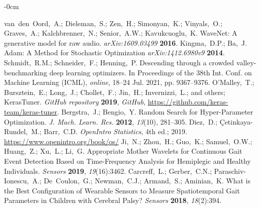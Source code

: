 \documentclass[sensors,article,submit,pdftex,moreauthors]{Definitions/mdpi}
\begin{document}
\begin{adjustwidth}{-\extralength}{0cm}
\begin{thebibliography}{999}
	van~den~Oord,~A.; Dieleman,~S.; Zen,~H.; Simonyan,~K.; Vinyals,~O.; Graves,~A.; Kalchbrenner,~N.; Senior,~A.W.; Kavukcuoglu,~K. WaveNet: A generative	model for raw audio. {\em arXiv:1609.03499} {\bf 2016}.
	Kingma,~D.P.; Ba,~J. Adam: A Method for Stochastic Optimization {\em arXiv:1412.6980v9} {\bf 2014}.
	Schmidt,~R.M.; Schneider,~F.; Henning,~P. Descending through a crowded valley-benchmarking deep learning optimizers. In Proceedings of the 38th Int. Conf. on Machine Learning (ICML), {\em online}, 18--24 Jul. 2021, pp. 9367--9376.
	O'Malley,~T.; Bursztein,~E.; Long,~J.; Chollet,~F.; Jin,~H.; Invernizzi,~L.; and others; KerasTuner. {\em GitHub repository} {\bf 2019}, {\em GitHub}, \url{https://github.com/keras-team/keras-tuner}.
	Bergstra,~J.; Bengio,~Y. Random Search for Hyper-Parameter Optimization. {\em J. Mach. Learn. Res.} {\bf 2012}, {\em 13}(10), 281--305.
	Diez,~D.; \c{C}etinkaya-Rundel,~M.; Barr,~C.D. \textit{OpenIntro Statistics}, 4th ed.; 2019. \url{https://www.openintro.org/book/os/}
	Ji,~N.; Zhou,~H.; Guo,~K.; Samuel,~O.W.; Huang,~Z.; Xu,~L.; Li,~G. Appropriate Mother Wavelets for Continuous Gait Event Detection Based on Time-Frequency Analysis for Hemiplegic and Healthy Individuals. {\em Sensors} {\bf 2019}, {\em 19}(16):3462.	
	Carcreff,~L.; Gerber,~C.N.; Paraschiv-Ionescu,~A.; De~Coulon,~G.; Newman,~C.J.; Armand,~S.; Aminian,~K. What is the Best Configuration of Wearable Sensors to Measure Spatiotemporal Gait Parameters in Children with Cerebral Palsy? {\em Sensors} {\bf 2018}, {\em 18}(2):394.
\end{thebibliography}

%



\end{adjustwidth}
\end{document}

